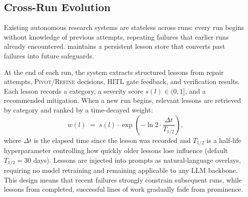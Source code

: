 \vspace{-0.3em}
\subsection{Cross-Run Evolution}
\label{sec:evolution}
\vspace{-0.3em}

Existing autonomous research systems are stateless across runs: every run begins without knowledge of previous attempts, repeating failures that earlier runs already encountered.
\system{} maintains a persistent lesson store that converts past failures into future safeguards.

At the end of each run, the system extracts structured lessons from repair attempts, \textsc{Pivot}/\textsc{Refine} decisions, HITL gate feedback, and verification results.
Each lesson records a category, a severity score $s(l) \in (0, 1]$, and a recommended mitigation.
When a new run begins, relevant lessons are retrieved by category and ranked by a time-decayed weight:
\begin{equation}
w(l) \;=\; s(l) \cdot \exp\!\left(-\ln 2 \cdot \frac{\Delta t}{T_{1/2}}\right),
\label{eq:lesson-weight}
\end{equation}
where $\Delta t$ is the elapsed time since the lesson was recorded and $T_{1/2}$ is a half-life hyperparameter controlling how quickly older lessons lose influence (default $T_{1/2} = 30$ days).
Lessons are injected into prompts as natural-language overlays, requiring no model retraining and remaining applicable to any LLM backbone.
This design means that recent failures strongly constrain subsequent runs, while lessons from completed, successful lines of work gradually fade from prominence.